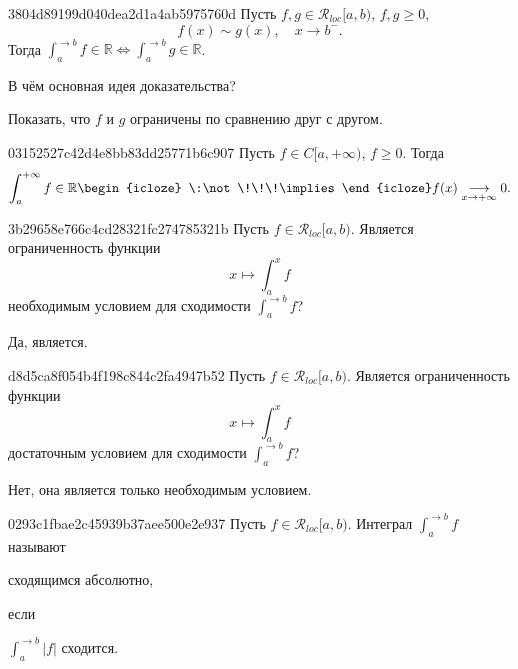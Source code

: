 \begin{note}{3804d89199d040dea2d1a4ab5975760d}
    Пусть \({ f, g \in \mathcal R_{loc}[a, b) }\),\: \({ f, g \geqslant 0 }\),
    \[
        f(x) \sim g(x), \quad x \to b^{-}.
    \]
    Тогда \({ \int_{a}^{\to b} f \in \mathbb R \iff \int_{a}^{\to b} g \in \mathbb R }\).

    В чём основная идея доказательства?

    \begin{cloze}{1}
        Показать, что \({ f }\) и \({ g }\) ограничены по сравнению друг с другом.
    \end{cloze}
\end{note}

\begin{note}{03152527c42d4e8bb83dd25771b6c907}
    Пусть \({ f \in C[a, +\infty) }\),\: \({ f \geqslant 0 }\).
    Тогда
    \[
        \int_{a}^{+\infty} f \in \mathbb R
        \begin{icloze}{1}\:\not\!\!\!\implies\end{icloze}
        f(x) \underset{x \to +\infty}\longrightarrow 0.
    \]
\end{note}

\begin{note}{3b29658e766c4cd28321fc274785321b}
    Пусть \({ f \in \mathcal R_{loc}[a, b) }\).
    Является ограниченность функции
    \[
        x \mapsto \int_{a}^{x} f
    \]
    необходимым условием для сходимости \({ \int_{a}^{\to b} f }\)?

    \begin{cloze}{1}
        Да, является.
    \end{cloze}
\end{note}

\begin{note}{d8d5ca8f054b4f198c844c2fa4947b52}
    Пусть \({ f \in \mathcal R_{loc}[a, b) }\).
    Является ограниченность функции
    \[
        x \mapsto \int_{a}^{x} f
    \]
    достаточным условием для сходимости \({ \int_{a}^{\to b} f }\)?

    \begin{cloze}{1}
        Нет, она является только необходимым условием.
    \end{cloze}
\end{note}

\begin{note}{0293c1fbae2c45939b37aee500e2e937}
    Пусть \({ f \in \mathcal R_{loc}[a, b) }\).
    Интеграл \({ \int_{a}^{\to b} f }\) называют \begin{icloze}{2}сходящимся абсолютно,\end{icloze} если \begin{icloze}{1}\({ \int_{a}^{\to b} \left\lvert f \right\rvert }\) сходится.\end{icloze}
\end{note}

